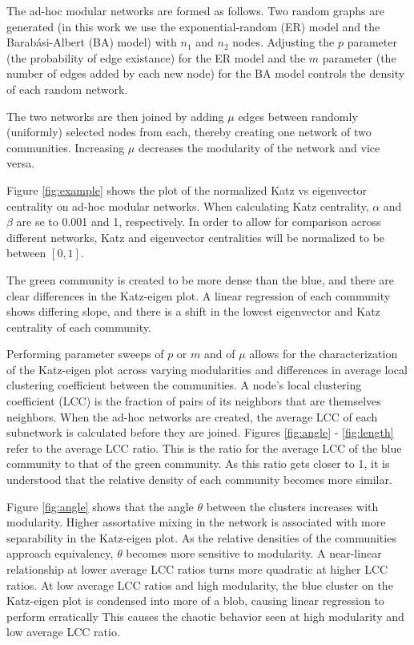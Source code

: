 \documentclass{IEEEtran}
\begin{document}
	The ad-hoc modular networks are formed as follows. Two random graphs are generated (in this work we use the exponential-random (ER) model\cite{ER} and the Barab\'asi-Albert (BA) model\cite{BA}) with $n_1$ and $n_2$ nodes. 
	Adjusting the $p$ parameter (the probability of edge existance) for the ER model and the $m$ parameter (the number of edges added by each new node) for the BA model controls the density of each random network.
	
	The two networks are then joined by adding $\mu$ edges between randomly (uniformly) selected nodes from each, thereby creating one network of two communities. Increasing $\mu$ decreases the modularity of the network and vice versa.
	
	Figure \ref{fig:example} shows the plot of the normalized Katz vs eigenvector centrality on ad-hoc modular networks. When calculating Katz centrality, $\alpha$ and $\beta$ are se to 0.001 and 1, respectively. In order to allow for comparison across different networks, Katz and eigenvector centralities will be normalized to be between $[0,1]$.
	
	The green community is created to be more dense than the blue, and there are clear differences in the Katz-eigen plot. A linear regression of each community shows differing slope, and there is a shift in the lowest eigenvector and Katz centrality of each community.
	
	Performing parameter sweeps of $p$ or $m$ and  of $\mu$ allows for the characterization of the Katz-eigen plot across varying modularities and differences in average local clustering coefficient between the communities.
	A node's local clustering coefficient (LCC) is the fraction of pairs of its neighbors that are themselves neighbors.
	When the ad-hoc networks are created, the average LCC of each subnetwork is calculated before they are joined. Figures \ref{fig:angle} - \ref{fig:length} refer to the average LCC ratio. This is the ratio for the average LCC of the blue community to that of the green community. As this ratio gets closer to 1, it is understood that the relative density of each community becomes more similar.
	
	Figure \ref{fig:angle} shows that the angle $\theta$ between the clusters  increases with modularity. Higher assortative mixing in the network is associated with more separability in the Katz-eigen plot. As the relative densities of the communities approach equivalency, $\theta$ becomes more sensitive to modularity. A near-linear relationship at lower average LCC ratios turns more quadratic at higher LCC ratios. At low average LCC ratios and high modularity, the blue cluster on the Katz-eigen plot is condensed into more of a blob, causing linear regression to perform erratically This causes the chaotic behavior seen at high modularity and low average LCC ratio.
	
\end{document}
